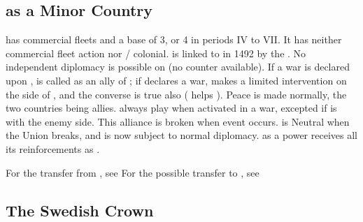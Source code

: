 \label{chSpecific:Sweden}

\subsection{ as a Minor Country}
\aparag {} has commercial fleets and a base \FTI of 3, or 4 in
periods IV to VII. It has neither commercial fleet action nor \COL/\TP
colonial.
\label{chSpecific:Sweden:Union Kalmar}  is
linked to  in 1492 by the . No
independent diplomacy is possible on  (no counter
available).
\bparag If a war is declared upon ,  is
called as an ally of  ; if  declares a
war,  makes a limited intervention on the side of
, and the converse is true also ( helps
).
\bparag Peace is made normally, the two countries being allies.
\bparag \POR always play  when activated in a war, excepted
if \POR is with the enemy side.
\bparag This alliance is broken when event 
occurs.
\bparag {} is Neutral when the Union breaks, and is now
subject to normal diplomacy.
\bparag {} as a \MIN power receives all its reinforcements as
.

\aparag[Transfers.]
\bparag For the transfer from , see
\bparag For the possible transfer to , see

\subsection{The Swedish Crown}

